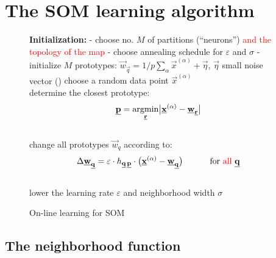 \section{The SOM learning algorithm}


\begin{frame}[shrink=1] 
\begin{figure}[!th]
\footnotesize
\removelatexerror
\begin{algorithm}[H]
\DontPrintSemicolon  
\textbf{Initialization:} \;
- choose no. $M$ of partitions (``neurons'') \textcolor{red}{and the topology of the map}\;
- choose annealing schedule for $\varepsilon$ and $\sigma$\;
- initialize $M$ prototypes: $\vec{w}_{\vec q} = 1/p \sum_\alpha \vec{x}^{(\alpha)}+\vec{\eta} $, \hspace{0.3cm}$\vec{\eta}$ small noise vector \;
\Begin(){
  choose a random data point $\vec{x}^{(\alpha)}$ \\
  determine the closest prototype:\[ \vec{p} = \underset{\vec r}{\argmin} \big| \vec{x}^{(\alpha)} - \vec{w}_{\vec r} \big|\] \\
  change all prototypes $\vec{w}_q$ according to: $$\Delta \vec{w}_{\vec q} = \varepsilon \cdot h_{\vec{q} \, \vec{p}} \cdot 
  \big( \vec{x}^{(\alpha)} - \vec{w}_{\vec q} \big) \text{\hspace{1cm} for \textcolor{red}{all} \vec{q}}$$ \\
  lower the learning rate $\varepsilon$ and neighborhood width $\sigma$
}
\label{alg:kohonen}
\caption{On-line learning for SOM}
\end{algorithm}
\end{figure}

\end{frame}

\subsection{The neighborhood function}

